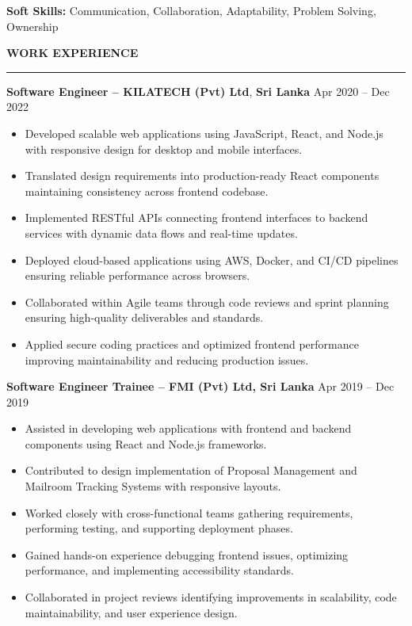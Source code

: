 \documentclass[10pt,letterpaper]{article}
\begin{document}
\textbf{Soft Skills:} Communication, Collaboration, Adaptability, Problem Solving, Ownership

\vspace{8pt}

\textbf{WORK EXPERIENCE}\\[-8pt]
\noindent\rule{\textwidth}{1pt}

\vspace{-2pt}

\textbf{Software Engineer -- KILATECH (Pvt) Ltd}, \textbf{Sri Lanka} \hfill Apr 2020 -- Dec 2022

\vspace{-1pt}

\begin{itemize}
\item Developed scalable web applications using JavaScript, React, and Node.js with responsive design for desktop and mobile interfaces.
\item Translated design requirements into production-ready React components maintaining consistency across frontend codebase.
\item Implemented RESTful APIs connecting frontend interfaces to backend services with dynamic data flows and real-time updates.
\item Deployed cloud-based applications using AWS, Docker, and CI/CD pipelines ensuring reliable performance across browsers.
\item Collaborated within Agile teams through code reviews and sprint planning ensuring high-quality deliverables and standards.
\item Applied secure coding practices and optimized frontend performance improving maintainability and reducing production issues.
\end{itemize}

\textbf{Software Engineer Trainee -- FMI (Pvt) Ltd, Sri Lanka} \hfill Apr 2019 -- Dec 2019

\vspace{-1pt}

\begin{itemize}
\item Assisted in developing web applications with frontend and backend components using React and Node.js frameworks.
\item Contributed to design implementation of Proposal Management and Mailroom Tracking Systems with responsive layouts.
\item Worked closely with cross-functional teams gathering requirements, performing testing, and supporting deployment phases.
\item Gained hands-on experience debugging frontend issues, optimizing performance, and implementing accessibility standards.
\item Collaborated in project reviews identifying improvements in scalability, code maintainability, and user experience design.
\end{itemize}
\end{document}
